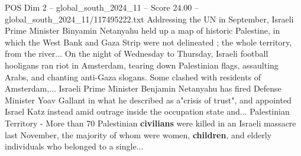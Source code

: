 \begin{textsample}{POS Dim 2 – global\_south\_2024\_11 – Score 24.00 – global\_south\_2024\_11/117495222.txt}
Addressing the UN in September, Israeli Prime Minister Binyamin Netanyahu held up a map of historic Palestine, in which the West Bank and Gaza Strip were not delineated ; the whole territory, from the river...
On the night of Wednesday to Thursday, Israeli football hooligans ran riot in Amsterdam, tearing down Palestinian flags, assaulting Arabs, and chanting anti-Gaza slogans.
Some clashed with residents of Amsterdam,...
Israeli Prime Minister Benjamin Netanyahu has fired Defense Minister Yoav Gallant in what he described as a"crisis of trust", and appointed Israel Katz instead amid outrage inside the occupation state and...
Palestinian Territory - More than 70 Palestinian \textbf{civilians} were killed in an Israeli massacre last November, the majority of whom were women, \textbf{children}, and elderly individuals who belonged to a single...

\end{textsample}
